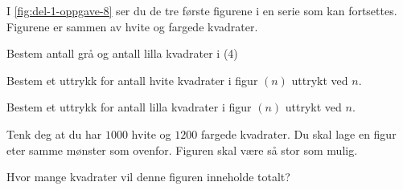 I \cref{fig:del-1-oppgave-8} ser du de tre første figurene i en serie som kan
fortsettes. Figurene er sammen av hvite og fargede kvadrater.

\begin{oppgaver}
   Bestem antall grå og antall lilla kvadrater i (4)
\end{oppgaver}

\begin{oppgaver}
   Bestem et uttrykk for antall hvite kvadrater i figur $(n)$ uttrykt
    ved $n$.
\end{oppgaver}

\begin{oppgaver}
   Bestem et uttrykk for antall lilla kvadrater i figur $(n)$ uttrykt
    ved $n$.
\end{oppgaver}

Tenk deg at du har $\num{1000}$ hvite og $\num{1200}$ fargede kvadrater. Du skal
lage en figur eter samme mønster som ovenfor. Figuren skal være så stor som
mulig.

\begin{oppgaver}
   Hvor mange kvadrater vil denne figuren inneholde totalt?
\end{oppgaver}
